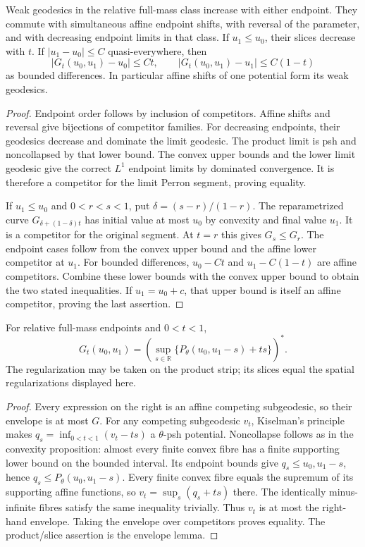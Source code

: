 \begin{proposition}\label{prop:perron-geodesic-order-and-limits}
Weak geodesics in the relative full-mass class increase with either endpoint. They commute with simultaneous affine endpoint shifts, with reversal of the parameter, and with decreasing endpoint limits in that class. If $u_1\leq u_0$, their slices decrease with $t$. If $|u_1-u_0|\leq C$ quasi-everywhere, then
\[
 |G_t(u_0,u_1)-u_0|\leq Ct,\qquad
 |G_t(u_0,u_1)-u_1|\leq C(1-t)
\]
as bounded differences. In particular affine shifts of one potential form its weak geodesics.
\end{proposition}
\begin{proof}
Endpoint order follows by inclusion of competitors. Affine shifts and reversal give bijections of competitor families. For decreasing endpoints, their geodesics decrease and dominate the limit geodesic. The product limit is psh and noncollapsed by that lower bound. The convex upper bounds and the lower limit geodesic give the correct $L^1$ endpoint limits by dominated convergence. It is therefore a competitor for the limit Perron segment, proving equality.

If $u_1\leq u_0$ and $0<r<s<1$, put $\delta=(s-r)/(1-r)$. The reparametrized curve $G_{\delta+(1-\delta)t}$ has initial value at most $u_0$ by convexity and final value $u_1$. It is a competitor for the original segment. At $t=r$ this gives $G_s\leq G_r$. The endpoint cases follow from the convex upper bound and the affine lower competitor at $u_1$. For bounded differences, $u_0-Ct$ and $u_1-C(1-t)$ are affine competitors. Combine these lower bounds with the convex upper bound to obtain the two stated inequalities. If $u_1=u_0+c$, that upper bound is itself an affine competitor, proving the last assertion.
\end{proof}

\begin{proposition}\label{prop:perron-rooftop-legendre-formula}
For relative full-mass endpoints and $0<t<1$,
\[
 G_t(u_0,u_1)
   =\left(\sup_{s\in\mathbb R}
                    \{P_\theta(u_0,u_1-s)+ts\}\right)^*.
\]
The regularization may be taken on the product strip; its slices equal the spatial regularizations displayed here.
\end{proposition}
\begin{proof}
Every expression on the right is an affine competing subgeodesic, so their envelope is at most $G$. For any competing subgeodesic $v_t$, Kiselman's principle makes
$q_s=\inf_{0<t<1}(v_t-ts)$ a $\theta$-psh potential. Noncollapse follows as in the convexity proposition: almost every finite convex fibre has a finite supporting lower bound on the bounded interval. Its endpoint bounds give $q_s\leq u_0,u_1-s$, hence $q_s\leq P_\theta(u_0,u_1-s)$. Every finite convex fibre equals the supremum of its supporting affine functions, so $v_t=\sup_s(q_s+ts)$ there. The identically minus-infinite fibres satisfy the same inequality trivially. Thus $v_t$ is at most the right-hand envelope. Taking the envelope over competitors proves equality. The product/slice assertion is the envelope lemma.
\end{proof}


